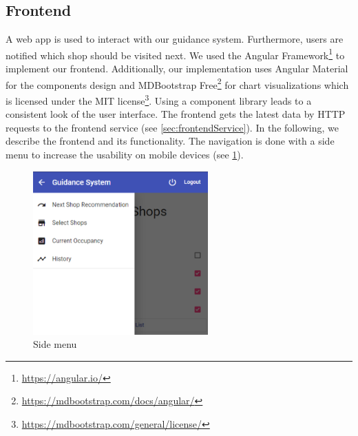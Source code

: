 \documentclass[runningheads]{llncs}
\begin{document}


\subsection{Frontend}
A web app is used to interact with our guidance system. Furthermore, users are notified which shop should be visited next. We used the Angular Framework\footnote{\url{https://angular.io/}} to implement our frontend. Additionally, our implementation uses Angular Material for the components design and MDBootstrap Free\footnote{\url{https://mdbootstrap.com/docs/angular/}} for chart
visualizations which is licensed under the MIT license\footnote{\url{https://mdbootstrap.com/general/license/}}. Using a component library leads to a consistent look of the user interface. The frontend gets the latest data by HTTP requests to the frontend service (see \cref{sec:frontendService}).
In the following, we describe the frontend and its functionality. The navigation is done with a side menu to increase the usability on mobile devices (see \cref{fig:sidenav}).

\begin{figure}
    \centering
    \includegraphics[width=0.6\textwidth]{assets/frontend/sidenav.png}
    \caption{Side menu}
    \label{fig:sidenav}
\end{figure}
\end{document}
